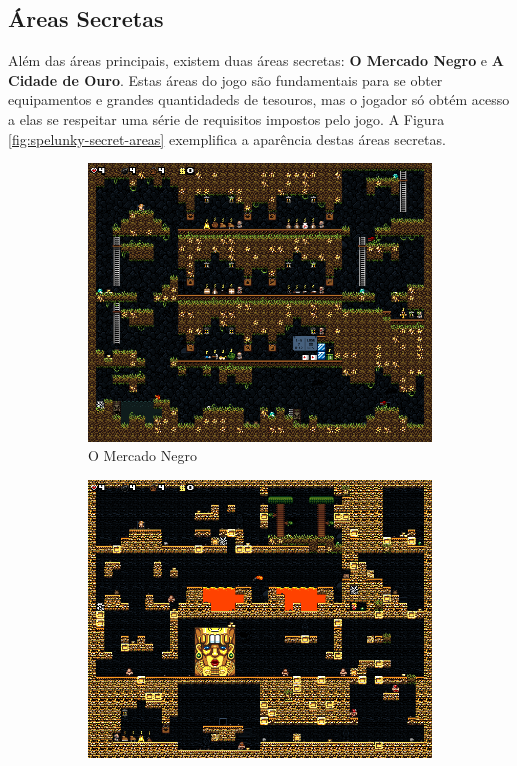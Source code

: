 \subsection{Áreas Secretas}
Além das áreas principais, existem duas áreas secretas: \textbf{O Mercado Negro}
e \textbf{A Cidade de Ouro}. Estas áreas do jogo são fundamentais para se obter
equipamentos e grandes quantidadeds de tesouros, mas o jogador só obtém acesso a
elas se respeitar uma série de requisitos impostos pelo jogo. A Figura
\ref{fig:spelunky-secret-areas} exemplifica a aparência destas áreas secretas.

\begin{figure}[htb!]
\centering
	\begin{subfigure}[b]{0.4\textwidth}
		\includegraphics[width=\textwidth]{fig/spelunky-blackmarket.png}
		\caption{O Mercado Negro}
		\label{fig:spelunky-blackmarket}
	\end{subfigure}
	\begin{subfigure}[b]{0.4\textwidth}
		\includegraphics[width=\textwidth]{fig/spelunky-cityofgold.png}

\end{subfigure}
\end{figure}
